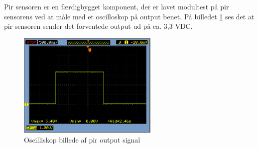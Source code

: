 Pir sensoren er en færdigbygget komponent, der er lavet modultest på pir sensorens ved at måle med et oscilloskop på output benet. På billedet \ref{lab:pir_sensor} ses det at pir sensoren sender det forventede output ud på ca. 3,3 VDC.    

\begin{figure}[htb]
\centering
\includegraphics[width=0.60\textwidth]{filer/pics/pir_sensor}
\caption{Oscilliskop billede af pir output signal}
\label{lab:pir_sensor}
\end{figure}

